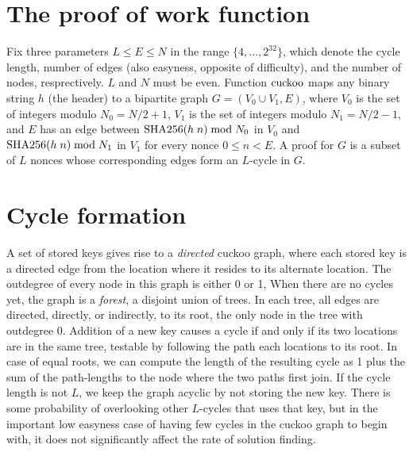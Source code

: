 \documentclass[11pt, oneside]{article}
\newcommand{\cuckoo}{{\rm cuckoo}}
\newcommand{\sha}{{\rm SHA256}}
\begin{document}
\section{The proof of work function}
Fix three parameters $L \leq E \leq N$ in the range $\{4,...,2^{32}\}$, which
denote the cycle length, number of edges (also easyness, opposite of difficulty),
and the number of nodes, resprectively. $L$ and $N$ must be even.
Function $\cuckoo$ maps any binary string $h$ (the header) to a bipartite graph
$G = (V_0 \cup V_1, E)$, where $V_0$ is the set of integers modulo $N_0=N/2+1$,
$V_1$ is the set of integers modulo $N_1=N/2-1$, and $E$ has an edge between
$\sha(h\;n) \bmod N_0$ in $V_0$ and $\sha(h\;n) \bmod N_1$ in $V_1$ for every
nonce $0 \leq n < E$. A proof for $G$ is a subset of $L$ nonces whose
corresponding edges form an $L$-cycle in $G$.

\section{Cycle formation}
A set of stored keys gives rise to a {\em directed} cuckoo graph, where each
stored key is a directed edge from the location where it resides to its
alternate location. The outdegree of every node in this
graph is either 0 or 1, When there are no cycles yet, the graph is a {\em
forest}, a disjoint union of trees. In each tree, all edges are directed,
directly, or indirectly, to its root,
the only node in the tree with outdegree 0. Addition of a new key causes a
cycle if and only if its two locations are in the same tree, testable
by following the path each locations to its root.
In case of equal roots, we can compute the length of the resulting cycle as
1 plus the sum of the path-lengths to the node where the two paths first join.
If the cycle length is not $L$, we keep the graph acyclic by not storing the new key.
There is some probability of overlooking other $L$-cycles
that uses that key, but in the important low easyness case of having few cycles
in the cuckoo graph to begin with, it does not significantly affect
the rate of solution finding.
\end{document}
